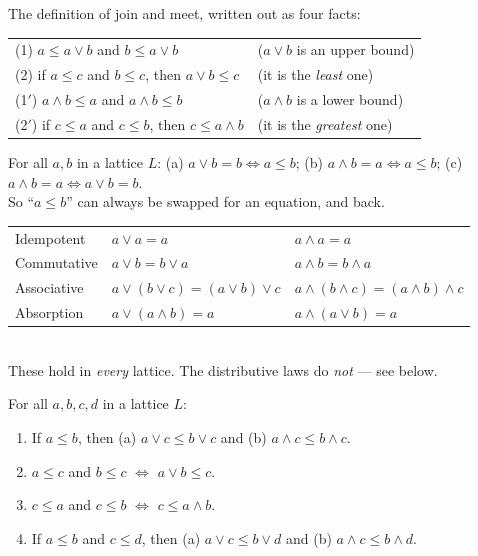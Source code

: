 \documentclass{fkt-notes}
\theoremstyle{definition}
\begin{document}
\noindent The definition of join and meet, written out as four facts:
\begin{rulepar}
  \begin{tabular}{@{}l@{\qquad}l@{}}
    (1) $a\le a\vee b$ and $b\le a\vee b$                  & ($a\vee b$ is an upper bound)   \\
    (2) if $a\le c$ and $b\le c$, then $a\vee b\le c$      & (it is the \emph{least} one)    \\
    (1$'$) $a\wedge b\le a$ and $a\wedge b\le b$           & ($a\wedge b$ is a lower bound)  \\
    (2$'$) if $c\le a$ and $c\le b$, then $c\le a\wedge b$ & (it is the \emph{greatest} one)
  \end{tabular}
\end{rulepar}

\begin{rulebox}[title={6.3 Theorem 2 (order vs.\ join and meet)}]
  For all $a,b$ in a lattice $L$:\quad
  (a) $a\vee b=b \iff a\le b$;\quad
  (b) $a\wedge b=a \iff a\le b$;\quad
  (c) $a\wedge b=a \iff a\vee b=b$.\\
  So ``$a\le b$'' can always be swapped for an equation, and back.
\end{rulebox}

\begin{rulebox}[title={6.3 Theorem 3 (algebraic laws)}]
  \begin{tabular}{@{}l@{\qquad}l@{\qquad}l@{}}
    Idempotent  & $a\vee a=a$                      & $a\wedge a=a$                            \\
    Commutative & $a\vee b=b\vee a$                & $a\wedge b=b\wedge a$                    \\
    Associative & $a\vee(b\vee c)=(a\vee b)\vee c$ & $a\wedge(b\wedge c)=(a\wedge b)\wedge c$ \\
    Absorption  & $a\vee(a\wedge b)=a$             & $a\wedge(a\vee b)=a$
  \end{tabular}\\
  These hold in \emph{every} lattice. The distributive laws do
  \emph{not} --- see below.
\end{rulebox}

\begin{rulebox}[title={6.3 Theorem 4 (monotonicity)}]
  For all $a,b,c,d$ in a lattice $L$:
  \begin{enumerate}[nosep,label=\arabic*.]
    \item If $a\le b$, then (a) $a\vee c\le b\vee c$ and (b) $a\wedge c\le b\wedge c$.
    \item $a\le c$ and $b\le c$ $\iff$ $a\vee b\le c$.
    \item $c\le a$ and $c\le b$ $\iff$ $c\le a\wedge b$.
    \item If $a\le b$ and $c\le d$, then (a) $a\vee c\le b\vee d$ and (b) $a\wedge c\le b\wedge d$.
  \end{enumerate}
\end{rulebox}
\end{document}
